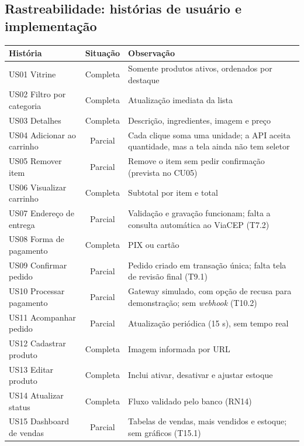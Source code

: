\documentclass[12pt]{article}
\begin{document}
\subsection{Rastreabilidade: histórias de usuário e implementação}

\begin{longtable}{|p{4.2cm}|c|p{7.4cm}|}
\hline
\rowcolor{gray!40} \textbf{História} & \textbf{Situação} & \textbf{Observação} \\ \hline
\endhead
US01 Vitrine & Completa & Somente produtos ativos, ordenados por destaque \\ \hline
US02 Filtro por categoria & Completa & Atualização imediata da lista \\ \hline
US03 Detalhes & Completa & Descrição, ingredientes, imagem e preço \\ \hline
US04 Adicionar ao carrinho & Parcial & Cada clique soma uma unidade; a API aceita quantidade, mas a tela ainda não tem seletor \\ \hline
US05 Remover item & Parcial & Remove o item sem pedir confirmação (prevista no CU05) \\ \hline
US06 Visualizar carrinho & Completa & Subtotal por item e total \\ \hline
US07 Endereço de entrega & Parcial & Validação e gravação funcionam; falta a consulta automática ao ViaCEP (T7.2) \\ \hline
US08 Forma de pagamento & Completa & PIX ou cartão \\ \hline
US09 Confirmar pedido & Parcial & Pedido criado em transação única; falta tela de revisão final (T9.1) \\ \hline
US10 Processar pagamento & Parcial & Gateway simulado, com opção de recusa para demonstração; sem \textit{webhook} (T10.2) \\ \hline
US11 Acompanhar pedido & Parcial & Atualização periódica (15 s), sem tempo real \\ \hline
US12 Cadastrar produto & Completa & Imagem informada por URL \\ \hline
US13 Editar produto & Completa & Inclui ativar, desativar e ajustar estoque \\ \hline
US14 Atualizar status & Completa & Fluxo validado pelo banco (RN14) \\ \hline
US15 Dashboard de vendas & Parcial & Tabelas de vendas, mais vendidos e estoque; sem gráficos (T15.1) \\ \hline
\end{longtable}
\end{document}
